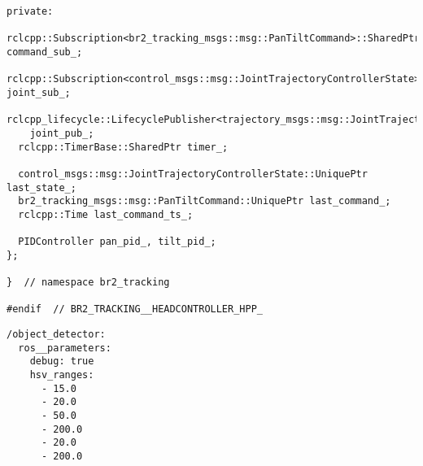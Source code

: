 \begin{tcolorbox}[sharp corners, colframe=gray!80, colback=LightGray, left=0pt, top=0pt, bottom=0pt, title=\texttt{br2\_tracking/include/br2\_tracking/HeadController.hpp}]
\begin{verbatim}
private:
  rclcpp::Subscription<br2_tracking_msgs::msg::PanTiltCommand>::SharedPtr command_sub_;
  rclcpp::Subscription<control_msgs::msg::JointTrajectoryControllerState>::SharedPtr joint_sub_;
  rclcpp_lifecycle::LifecyclePublisher<trajectory_msgs::msg::JointTrajectory>::SharedPtr
    joint_pub_;
  rclcpp::TimerBase::SharedPtr timer_;

  control_msgs::msg::JointTrajectoryControllerState::UniquePtr last_state_;
  br2_tracking_msgs::msg::PanTiltCommand::UniquePtr last_command_;
  rclcpp::Time last_command_ts_;

  PIDController pan_pid_, tilt_pid_;
};

}  // namespace br2_tracking

#endif  // BR2_TRACKING__HEADCONTROLLER_HPP_
    \end{verbatim}
    \end{tcolorbox}
  \normalsize

 \footnotesize
\begin{tcolorbox}[sharp corners, colframe=gray!80, colback=LightGray, left=0pt, top=0pt, bottom=0pt, title=\texttt{br2\_tracking/config/detector.yaml}]
  \begin{verbatim}
/object_detector:
  ros__parameters:
    debug: true
    hsv_ranges:
      - 15.0
      - 20.0
      - 50.0
      - 200.0
      - 20.0
      - 200.0
    \end{verbatim}
    \end{tcolorbox}
  \normalsize

